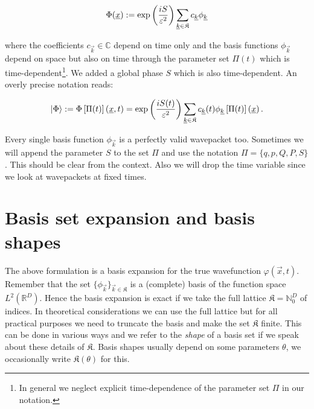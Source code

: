 \begin{equation}
  \Phi(\underline{x}) := \exp\left(\frac{i S}{\varepsilon^2}\right) \sum_{\underline{k}\in\mathfrak{K}} c_{\underline{k}} \phi_{\underline{k}}
\end{equation}

where the coefficients $c_{\vec{k}} \in \mathbb{C}$ depend on time only and the basis functions
$\phi_{\vec{k}}$ depend on space but also on time through the parameter set
$\Pi(t)$ which is time-dependent\footnote{In general we neglect explicit
time-dependence of the parameter set $\Pi$ in our notation.}. We added a global
phase $S$ which is also time-dependent. An overly precise notation reads:

\begin{definition}
  \begin{equation} \label{eq:scalar_wavepacket}
    \Ket{\Phi} :=
    \Phi\left[\Pi(t)\right](\underline{x}, t)
    =
    \exp\left(\frac{i S(t)}{\varepsilon^2}\right) \sum_{\underline{k}\in\mathfrak{K}} c_{\underline{k}}(t) \phi_{\underline{k}}\left[\Pi(t)\right](\underline{x}) \,.
  \end{equation}
\end{definition}

Every single basis function $\phi_{\vec{k}}$ is a perfectly valid wavepacket too.
Sometimes we will append the parameter $S$ to the set $\Pi$ and use the notation
$\Pi = \{q,p,Q,P,S\}$. This should be clear from the context. Also we will drop
the time variable since we look at wavepackets at fixed times.


\section{Basis set expansion and basis shapes}


The above formulation is a basis expansion for the true wavefunction $\varphi(\vec{x}, t)$.
Remember that the set $\{\phi_{\vec{k}}\}_{\vec{k}\in\mathfrak{K}}$ is a (complete)
basis of the function space $L^2(\mathbb{R}^D)$. Hence the basis expansion is
exact if we take the full lattice $\mathfrak{K} = \mathbb{N}_0^D$ of indices. In
theoretical considerations we can use the full lattice but for all practical
purposes we need to truncate the basis and make the set $\mathfrak{K}$ finite.
This can be done in various ways and we refer to the \emph{shape} of a basis set
if we speak about these details of $\mathfrak{K}$. Basis shapes usually depend
on some parameters $\theta$, we occasionally write $\mathfrak{K}(\theta)$ for this.

